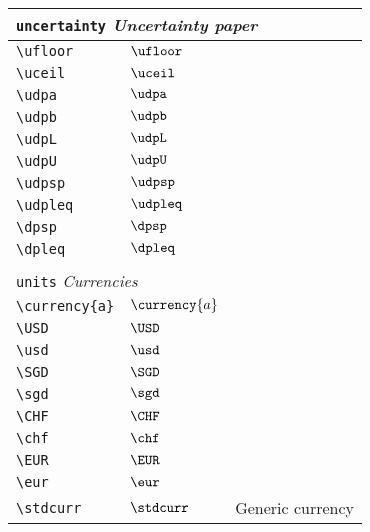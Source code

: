 \begin{longtable}{lll}
 \multicolumn{3}{l}{{\color[rgb]{0.5,0.5,0.5}\texttt{uncertainty}} \emph{Uncertainty paper}}\\ 
 \hline
\hline
{\color[rgb]{0.5,0.5,0.5}\texttt{\textbackslash ufloor}} & $\ufloor$ & \\ 
 {\color[rgb]{0.5,0.5,0.5}\texttt{\textbackslash uceil}} & $\uceil$ & \\ 
 {\color[rgb]{0.5,0.5,0.5}\texttt{\textbackslash udpa}} & $\udpa$ & \\ 
 {\color[rgb]{0.5,0.5,0.5}\texttt{\textbackslash udpb}} & $\udpb$ & \\ 
 {\color[rgb]{0.5,0.5,0.5}\texttt{\textbackslash udpL}} & $\udpL$ & \\ 
 {\color[rgb]{0.5,0.5,0.5}\texttt{\textbackslash udpU}} & $\udpU$ & \\ 
 {\color[rgb]{0.5,0.5,0.5}\texttt{\textbackslash udpsp}} & $\udpsp$ & \\ 
 {\color[rgb]{0.5,0.5,0.5}\texttt{\textbackslash udpleq}} & $\udpleq$ & \\ 
 {\color[rgb]{0.5,0.5,0.5}\texttt{\textbackslash dpsp}} & $\dpsp$ & \\ 
 {\color[rgb]{0.5,0.5,0.5}\texttt{\textbackslash dpleq}} & $\dpleq$ & \\ 
  &  & \\ 
 \multicolumn{3}{l}{{\color[rgb]{0.5,0.5,0.5}\texttt{units}} \emph{Currencies}}\\ 
 \hline
\hline
{\color[rgb]{0.5,0.5,0.5}\texttt{\textbackslash currency\{a\}}} & $\currency{a}$ & \\ 
 {\color[rgb]{0.5,0.5,0.5}\texttt{\textbackslash USD}} & $\USD$ & \\ 
 {\color[rgb]{0.5,0.5,0.5}\texttt{\textbackslash usd}} & $\usd$ & \\ 
 {\color[rgb]{0.5,0.5,0.5}\texttt{\textbackslash SGD}} & $\SGD$ & \\ 
 {\color[rgb]{0.5,0.5,0.5}\texttt{\textbackslash sgd}} & $\sgd$ & \\ 
 {\color[rgb]{0.5,0.5,0.5}\texttt{\textbackslash CHF}} & $\CHF$ & \\ 
 {\color[rgb]{0.5,0.5,0.5}\texttt{\textbackslash chf}} & $\chf$ & \\ 
 {\color[rgb]{0.5,0.5,0.5}\texttt{\textbackslash EUR}} & $\EUR$ & \\ 
 {\color[rgb]{0.5,0.5,0.5}\texttt{\textbackslash eur}} & $\eur$ & \\ 
 {\color[rgb]{0.5,0.5,0.5}\texttt{\textbackslash stdcurr}} & $\stdcurr$ &  Generic currency\\ 

\end{longtable}
